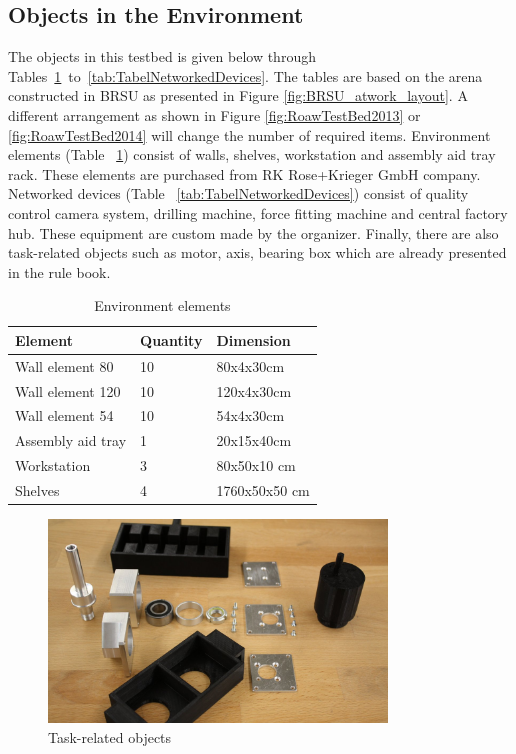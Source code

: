 \subsection{Objects in the Environment}

The objects in this testbed is given below through Tables~\ref{tab:TabelEnvironmentElements}~to~\ref{tab:TabelNetworkedDevices}. 
The tables are based on the arena constructed in BRSU as presented in Figure \ref{fig:BRSU_atwork_layout}.
A different arrangement as shown in Figure \ref{fig:RoawTestBed2013} or \ref{fig:RoawTestBed2014} will change the number of required items.
Environment elements (Table ~\ref{tab:TabelEnvironmentElements}) consist of walls, shelves, workstation and assembly aid tray rack.
These elements are purchased from RK Rose+Krieger GmbH company.
Networked devices (Table ~\ref{tab:TabelNetworkedDevices}) consist of quality control camera system, drilling machine, force fitting machine and central factory hub.
These equipment are custom made by the \erlir organizer.
Finally, there are also task-related objects such as motor, axis, bearing box which are already presented in the rule book.


\begin{table}[htb]
 \begin{tabular}{|p{5cm}|p{2cm}|p{5cm}|}
 \hline
 \textbf{Element} & \textbf{Quantity} & \textbf{Dimension} \\ \hline
 Wall element 80 & 10 & 80x4x30cm \\ \hline
 Wall element 120 & 10 & 120x4x30cm \\ \hline
 Wall element 54 & 10 & 54x4x30cm \\ \hline
 Assembly aid tray & 1 & 20x15x40cm \\ \hline
 Workstation & 3 & 80x50x10 cm \\ \hline
 Shelves & 4 & 1760x50x50 cm \\ \hline
\end{tabular}
\caption{Environment elements}
\label{tab:TabelEnvironmentElements}
\end{table}

\begin{figure}[htb]
 \begin{center}
 \includegraphics[width=9cm]{pics/atwork/objects/roawObjects.jpg} 
 \end{center}
 \caption{Task-related objects}
 \label{fig:TaskRelatedObjects}
\end{figure}


